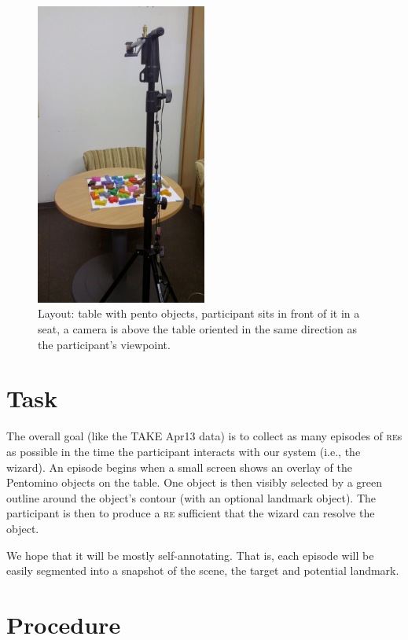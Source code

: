 \documentclass[a4paper,10pt]{article}
\begin{document}
\begin{figure}
 \centering
      \includegraphics[width=0.5\textwidth]{takecvsetup.jpg}	
      \caption{Layout: table with pento objects, participant sits in front of it in a seat, a camera is above the table oriented in the same direction as the participant's viewpoint.\label{layout}}
\end{figure}

\section{Task}

The overall goal (like the TAKE Apr13 data) is to collect as many episodes of \textsc{re}s as possible in the time the participant interacts with our system (i.e., the wizard). An episode begins when a small screen shows an overlay of the Pentomino objects on the table. One object is then visibly selected by a green outline around the object's contour (with an optional landmark object). The participant is then to produce a \textsc{re} sufficient that the wizard can resolve the object.

We hope that it will be mostly self-annotating. That is, each episode will be easily segmented into a snapshot of the scene, the target and potential landmark. 

\section{Procedure}
\end{document}
